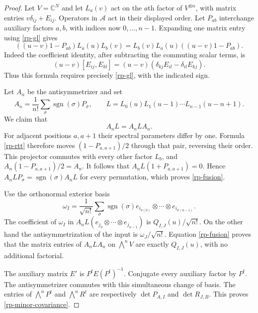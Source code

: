 \begin{proof}
Let $V=\mathbb C^N$ and let $L_a(v)$ act on the $a$th
factor of $V^{\otimes n}$, with matrix entries
$v\delta_{ij}+E_{ij}$.  Operators in $\mathcal A$ act in
their displayed order.  Let $P_{ab}$ interchange auxiliary
factors $a,b$, with indices now $0,\ldots,n-1$.
Expanding one matrix entry using \eqref{rp-gl} gives
\begin{equation}\label{rp-rtt}
 ((u-v)1-P_{ab})L_a(u)L_b(v)
 =L_b(v)L_a(u)((u-v)1-P_{ab}).
\end{equation}
Indeed the coefficient identity, after subtracting the
commuting scalar terms, is
\[
 (u-v)[E_{ij},E_{kl}]
 =(u-v)(\delta_{kj}E_{il}-\delta_{il}E_{kj}).
\]
Thus this formula requires precisely \eqref{rp-gl}, with
the indicated sign.

Let $A_n$ be the antisymmetrizer and set
\[
 A_n=\frac1{n!}\sum_{\sigma}\operatorname{sgn}(\sigma)P_\sigma,
 \qquad L=L_0(u)L_1(u-1)\cdots L_{n-1}(u-n+1).
\]
We claim that
\begin{equation}\label{rp-fusion}
                           A_nL=A_nLA_n.
\end{equation}
For adjacent positions $a,a+1$ their spectral parameters
differ by one.  Formula \eqref{rp-rtt} therefore moves
$(1-P_{a,a+1})/2$ through that pair, reversing their
order.  This projector commutes with every other factor
$L_b$, and $A_n(1-P_{a,a+1})/2=A_n$.  It follows that
$A_nL(1+P_{a,a+1})=0$.  Hence $A_nLP_\sigma
=\operatorname{sgn}(\sigma)A_nL$ for every permutation,
which proves \eqref{rp-fusion}.

Use the orthonormal exterior basis
\[
 \omega_I=\frac1{\sqrt{n!}}
      \sum_{\sigma}\operatorname{sgn}(\sigma)
      e_{i_{\sigma(0)}}\otimes\cdots\otimes e_{i_{\sigma(n-1)}}.
\]
The coefficient of $\omega_I$ in $A_nL(e_{j_0}\otimes
\cdots\otimes e_{j_{n-1}})$ is $Q_{I,J}(u)/\sqrt{n!}$.
On the other hand the antisymmetrization of the input is
$\omega_J/\sqrt{n!}$.  Equation \eqref{rp-fusion} proves
that the matrix entries of $A_nLA_n$ on $\bigwedge^nV$
are exactly $Q_{I,J}(u)$, with no additional factorial.

The auxiliary matrix $E'$ is $P^tE(P^t)^{-1}$.
Conjugate every auxiliary factor by $P^t$.
The antisymmetrizer commutes with this simultaneous change
of basis.  The entries of $\bigwedge^nP^t$ and
$\bigwedge^nR^t$ are respectively $\det P_{A,I}$ and
$\det R_{J,B}$.  This proves
\eqref{rp-minor-covariance}.


\end{proof}

